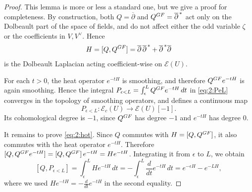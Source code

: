 \documentclass[10pt,a4paper]{amsart}
\newcommand{\GF}{\textup{GF}}
\newcommand{\bpd}{\overline{\partial}}
\newcommand{\clE}{\mathcal{E}}
\newcommand{\ep}{\epsilon}
\newcommand{\lto}{\longrightarrow}
\begin{document}
\begin{proof}
This lemma is more or less a standard one, 
but we give a proof for completeness.
By construction, both $Q=\bpd$ and $Q^{\GF}=\bpd^{\,*}$ 
act only on the Dolbeault part of the space of fields, and do not affect
either the odd variable $\zeta$ or the coefficients in $V,V^\vee$. 
Hence
\[
 H = [Q,Q^{\GF}] = \bpd\,\bpd^{\,*} + \bpd^{\,*}\bpd
\]
is the Dolbeault Laplacian acting coefficient-wise on $\clE(U)$.

For each $t>0$, the heat operator $e^{-tH}$ is smoothing, 
and therefore $Q^{\GF}e^{-tH}$ is again smoothing. 
Hence the integral
$P_{\ep<L} = \int_\ep^L Q^{\GF}e^{-tH}\,dt$ in \eqref{eq:2:PeL} 
converges in the topology of smoothing operators, and defines a continuous map
\[
 P_{\ep<L}\colon \clE_c(U) \lto \clE(U)[-1].
\]
Its cohomological degree is $-1$, 
since $Q^{\GF}$ has degree $-1$ and $e^{-tH}$ has degree $0$.

It remains to prove \eqref{eq:2:hot}. 
Since $Q$ commutes with $H=[Q,Q^{\GF}]$, 
it also commutes with the heat operator $e^{-tH}$. 
Therefore
$[Q,Q^{\GF}e^{-tH}] = [Q,Q^{\GF}]\,e^{-tH} = He^{-tH}$.
Integrating it from $\ep$ to $L$, we obtain
\[
 [Q,P_{\ep<L}] = \int_\ep^L He^{-tH}\,dt =
 -\int_\ep^L \frac{d}{dt}e^{-tH}\,dt =
 e^{-\ep H}-e^{-LH},
\]
where we used $He^{-tH}=-\frac{d}{dt}e^{-tH}$ in the second equality.
\end{proof}
\end{document}

